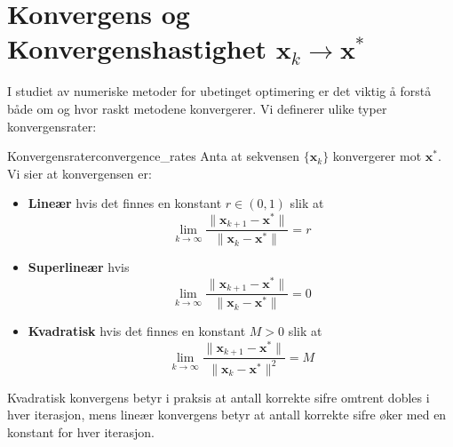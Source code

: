 \section{Konvergens og Konvergenshastighet \texorpdfstring{\(\symbf{x}_k \to \symbf{x}^\ast\)}{x\_k to x\_ast}}
\label{sec:convergence}

I studiet av numeriske metoder for ubetinget optimering er det viktig å forstå både om og hvor raskt metodene konvergerer. Vi definerer ulike typer konvergensrater:

\begin{definition}{Konvergensrater}{convergence_rates}
	Anta at sekvensen \(\{\symbf{x}_k\}\) konvergerer mot \(\symbf{x}^\ast\). Vi sier at konvergensen er:
	\begin{itemize}
		\item \textbf{Lineær} hvis det finnes en konstant \(r \in (0,1)\) slik at
		      \[
			      \lim_{k \to \infty} \frac{\|\symbf{x}_{k+1} - \symbf{x}^\ast\|}{\|\symbf{x}_k - \symbf{x}^\ast\|} = r
		      \]

		\item \textbf{Superlineær} hvis
		      \[
			      \lim_{k \to \infty} \frac{\|\symbf{x}_{k+1} - \symbf{x}^\ast\|}{\|\symbf{x}_k - \symbf{x}^\ast\|} = 0
		      \]

		\item \textbf{Kvadratisk} hvis det finnes en konstant \(M > 0\) slik at
		      \[
			      \lim_{k \to \infty} \frac{\|\symbf{x}_{k+1} - \symbf{x}^\ast\|}{\|\symbf{x}_k - \symbf{x}^\ast\|^2} = M
		      \]
	\end{itemize}
\end{definition}

Kvadratisk konvergens betyr i praksis at antall korrekte sifre omtrent dobles i hver iterasjon, mens lineær konvergens betyr at antall korrekte sifre øker med en konstant for hver iterasjon.

